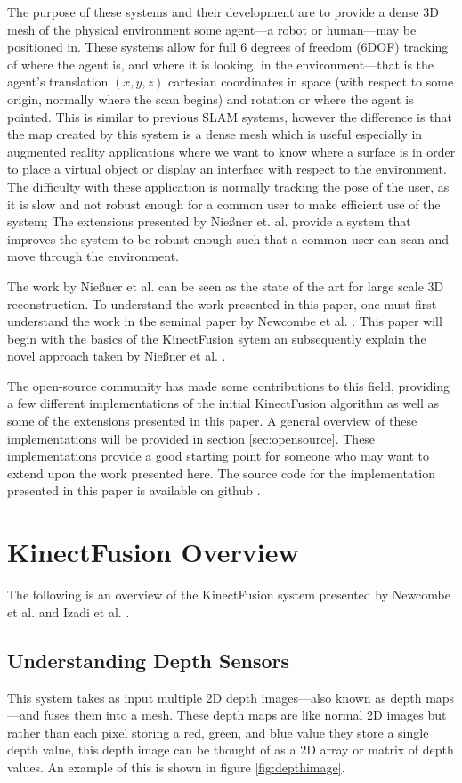 \documentclass[10pt, twocolumn]{article}
\begin{document}
The purpose of these systems and their development are to provide a dense 3D
mesh of the physical environment some agent---a robot or human---may be
positioned in. 
These systems allow for full 6 degrees of freedom (6DOF) tracking of where the agent is, and where it is looking, in the environment---that is the agent's translation $(x, y, z)$ cartesian coordinates in space (with respect to some origin, normally where the scan begins) and rotation or where the agent is pointed. 
This is similar to previous SLAM systems, however the difference is that the map created by this system is a dense mesh which is useful especially in augmented reality applications where we want to know where a surface is in order to place a virtual object or display an interface with respect to the environment. 
The difficulty with these application is normally tracking the pose of the user,
as it is slow and not robust enough for a common user to make efficient use of
the system; The extensions presented by Nie{\ss}ner et. al. provide a system
that improves the system to be robust enough such that a common user can scan
and move through the environment. 

The work by Nie{\ss}ner et al. can be seen as the state of the art
for large scale 3D reconstruction. To understand the work presented in this
paper, one must first understand the work in the seminal paper by Newcombe et
al. \cite{newcombe11}. This paper will begin with the basics of the KinectFusion
sytem an subsequently explain the novel approach taken by Nie{\ss}ner et al. \cite{niessner2013hashing}.

The open-source community has made some contributions to this
field, providing a few different implementations of the initial KinectFusion
algorithm as well as some of the extensions presented in this paper. A general
overview of these implementations will be provided in section
\ref{sec:opensource}. These implementations provide a good starting point for
someone who may want to extend upon the work presented here. The source code for
the implementation presented in this paper is available on github \cite{voxelhashing}.

\section{KinectFusion Overview}
The following is an overview of the KinectFusion system presented by Newcombe et
al. \cite{newcombe11} and Izadi et al. \cite{izadi11}.

\subsection{Understanding Depth Sensors}
This system takes as input multiple 2D depth images---also known as depth maps---and fuses them into a mesh. These depth maps are like normal 2D images but rather than each pixel storing a red, green, and blue value they store a single depth value, this depth image can be thought of as a 2D array or matrix of depth values. An example of this is shown in figure \ref{fig:depthimage}. 
\end{document}
